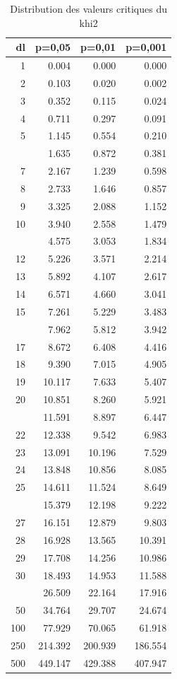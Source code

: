 \documentclass[
  11pt,
  french,
]{book}
\begin{document}
\begin{table}

\caption{\label{tab:tableCritiqueT}Distribution des valeurs critiques du khi2}
\centering
\begin{tabular}[t]{rrrr}
\toprule
dl & p=0,05 & p=0,01 & p=0,001\\
\midrule
1 & 0.004 & 0.000 & 0.000\\
2 & 0.103 & 0.020 & 0.002\\
3 & 0.352 & 0.115 & 0.024\\
4 & 0.711 & 0.297 & 0.091\\
5 & 1.145 & 0.554 & 0.210\\
\addlinespace
6 & 1.635 & 0.872 & 0.381\\
7 & 2.167 & 1.239 & 0.598\\
8 & 2.733 & 1.646 & 0.857\\
9 & 3.325 & 2.088 & 1.152\\
10 & 3.940 & 2.558 & 1.479\\
\addlinespace
11 & 4.575 & 3.053 & 1.834\\
12 & 5.226 & 3.571 & 2.214\\
13 & 5.892 & 4.107 & 2.617\\
14 & 6.571 & 4.660 & 3.041\\
15 & 7.261 & 5.229 & 3.483\\
\addlinespace
16 & 7.962 & 5.812 & 3.942\\
17 & 8.672 & 6.408 & 4.416\\
18 & 9.390 & 7.015 & 4.905\\
19 & 10.117 & 7.633 & 5.407\\
20 & 10.851 & 8.260 & 5.921\\
\addlinespace
21 & 11.591 & 8.897 & 6.447\\
22 & 12.338 & 9.542 & 6.983\\
23 & 13.091 & 10.196 & 7.529\\
24 & 13.848 & 10.856 & 8.085\\
25 & 14.611 & 11.524 & 8.649\\
\addlinespace
26 & 15.379 & 12.198 & 9.222\\
27 & 16.151 & 12.879 & 9.803\\
28 & 16.928 & 13.565 & 10.391\\
29 & 17.708 & 14.256 & 10.986\\
30 & 18.493 & 14.953 & 11.588\\
\addlinespace
40 & 26.509 & 22.164 & 17.916\\
50 & 34.764 & 29.707 & 24.674\\
100 & 77.929 & 70.065 & 61.918\\
250 & 214.392 & 200.939 & 186.554\\
500 & 449.147 & 429.388 & 407.947\\
\bottomrule
\end{tabular}
\end{table}
\end{document}
